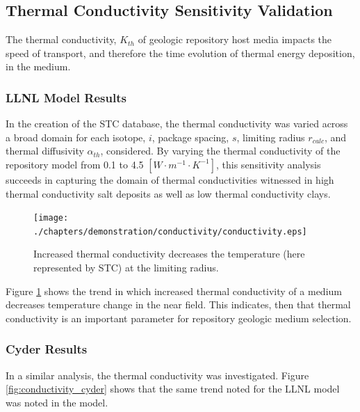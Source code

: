 \subsection{Thermal Conductivity Sensitivity Validation}\label{sec:conductivity}
The thermal conductivity, $K_{th}$ of geologic repository host media impacts 
the speed of transport, and therefore the time evolution of thermal energy 
deposition, in the medium. 

\FloatBarrier
\subsubsection{LLNL Model Results}
In the creation of the \gls{STC} database, the thermal conductivity was varied 
across a broad domain for each isotope, $i$, package spacing, $s$, limiting 
radius $r_{calc}$, and thermal diffusivity $\alpha_{th}$, considered.  By 
varying the thermal conductivity of the repository model from 0.1 to 4.5
$[W\cdot m^{-1} \cdot K^{-1}]$, this sensitivity analysis succeeds in capturing the domain of 
thermal conductivities witnessed in high thermal conductivity salt deposits as 
well as low thermal conductivity clays.

  \begin{figure}[htbp!]
    \begin{center}
      \texttt{[image: ./chapters/demonstration/conductivity/conductivity.eps]}
    \end{center}
    \caption[$K_{th}$ Sensitivity in LLNL Model]{Increased thermal conductivity 
      decreases the temperature (here represented by STC) at the limiting 
    radius.}
    \label{fig:Cm242Kth_alpha_low}
  \end{figure}

Figure \ref{fig:Cm242Kth_alpha_low} shows the trend in which increased thermal 
conductivity of a medium decreases temperature change 
in the near field. This indicates, then that thermal conductivity is 
an important parameter for repository geologic medium selection. 

\FloatBarrier
\subsubsection{Cyder Results}
In a similar analysis, the thermal conductivity was investigated. Figure 
\ref{fig:conductivity_cyder} shows that the same trend noted for the LLNL model 
was noted in the 
\Cyder model.

